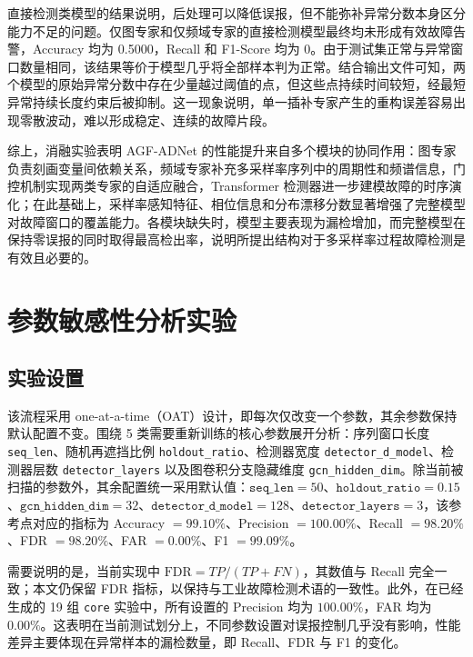 \documentclass[bachelor, vlined]{DissertUESTC}
\begin{document}
    直接检测类模型的结果说明，后处理可以降低误报，但不能弥补异常分数本身区分能力不足的问题。仅图专家和仅频域专家的直接检测模型最终均未形成有效故障告警，Accuracy 均为 0.5000，Recall 和 F1-Score 均为 0。由于测试集正常与异常窗口数量相同，该结果等价于模型几乎将全部样本判为正常。结合输出文件可知，两个模型的原始异常分数中存在少量越过阈值的点，但这些点持续时间较短，经最短异常持续长度约束后被抑制。这一现象说明，单一插补专家产生的重构误差容易出现零散波动，难以形成稳定、连续的故障片段。

    综上，消融实验表明 AGF-ADNet 的性能提升来自多个模块的协同作用：图专家负责刻画变量间依赖关系，频域专家补充多采样率序列中的周期性和频谱信息，门控机制实现两类专家的自适应融合，Transformer 检测器进一步建模故障的时序演化；在此基础上，采样率感知特征、相位信息和分布漂移分数显著增强了完整模型对故障窗口的覆盖能力。各模块缺失时，模型主要表现为漏检增加，而完整模型在保持零误报的同时取得最高检出率，说明所提出结构对于多采样率过程故障检测是有效且必要的。

    \section{参数敏感性分析实验}
    \label{sec:sensitivity_report}

    \subsection{实验设置}

    该流程采用 one-at-a-time（OAT）设计，即每次仅改变一个参数，其余参数保持默认配置不变。围绕 5 类需要重新训练的核心参数展开分析：序列窗口长度 \texttt{seq\_len}、随机再遮挡比例 \texttt{holdout\_ratio}、检测器宽度 \texttt{detector\_d\_model}、检测器层数 \texttt{detector\_layers} 以及图卷积分支隐藏维度 \texttt{gcn\_hidden\_dim}。除当前被扫描的参数外，其余配置统一采用默认值：\(\texttt{seq\_len}=50\)、\(\texttt{holdout\_ratio}=0.15\)、\(\texttt{gcn\_hidden\_dim}=32\)、\(\texttt{detector\_d\_model}=128\)、\(\texttt{detector\_layers}=3\)，该参考点对应的指标为 Accuracy \(=99.10\%\)、Precision \(=100.00\%\)、Recall \(=98.20\%\)、FDR \(=98.20\%\)、FAR \(=0.00\%\)、F1 \(=99.09\%\)。

    需要说明的是，当前实现中 \(\mathrm{FDR}=TP/(TP+FN)\)，其数值与 Recall 完全一致；本文仍保留 FDR 指标，以保持与工业故障检测术语的一致性。此外，在已经生成的 19 组 \texttt{core} 实验中，所有设置的 Precision 均为 \(100.00\%\)，FAR 均为 \(0.00\%\)。这表明在当前测试划分上，不同参数设置对误报控制几乎没有影响，性能差异主要体现在异常样本的漏检数量，即 Recall、FDR 与 F1 的变化。
\end{document}
